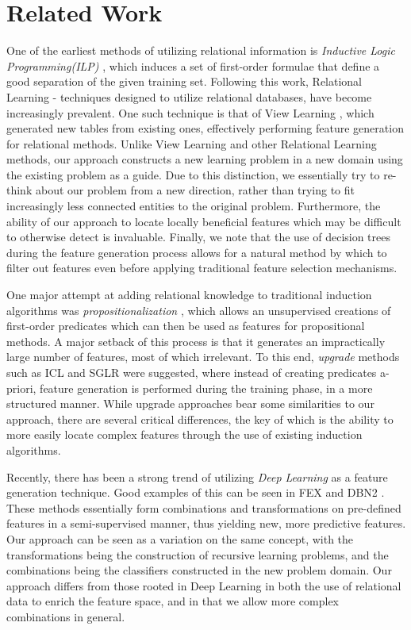 \documentclass[twoside,11pt]{article}
\theoremstyle{definition}
\begin{document}
\section{Related Work}
One of the earliest methods of utilizing relational information is \emph{Inductive Logic Programming(ILP)} \cite{quinlan1990learning,muggleton1991inductive}, which induces a set of first-order formulae that define a good separation of the given training set.
Following this work, Relational Learning - techniques designed to utilize relational databases, have become increasingly prevalent. One such technique is that of View Learning \cite{davis2005view}, which generated new tables from existing ones, effectively performing feature generation for relational methods.
Unlike View Learning and other Relational Learning methods, our approach constructs a new learning problem in a new domain using the existing problem as a guide. Due to this distinction, we essentially try to re-think about our problem from a new direction, rather than trying to fit increasingly less connected entities to the original problem. Furthermore, the ability of our approach to locate locally beneficial features which may be difficult to otherwise detect is invaluable. Finally, we note that the use of decision trees during the feature generation process allows for a natural method by which to filter out features even before applying traditional feature selection mechanisms.

One major attempt at adding relational knowledge to traditional induction algorithms was \emph{propositionalization} \cite{kramer2000bottom}, which allows an unsupervised creations of first-order predicates which can then be used as features for propositional methods. A major setback of this process is that it generates an impractically large number of features, most of which irrelevant.  To this end, \emph{upgrade} methods such as ICL \cite{van2001upgrade} and SGLR \cite{popescul200716} were suggested, where instead of creating predicates a-priori, feature generation is performed during the training phase, in a more structured manner. While upgrade approaches bear some similarities to our approach, there are several critical differences, the key of which is the ability to more easily locate complex features through the use of existing induction algorithms.

Recently, there has been a strong trend of utilizing \emph{Deep Learning} \cite{lecun1998gradient,bengio2009learning} as a feature generation technique. Good examples of this can be seen in FEX \cite{plotz2011featurefull} and DBN2 \cite{kim2013deepfull}. These methods essentially form combinations and transformations on pre-defined features in a semi-supervised manner, thus yielding new, more predictive features. Our approach can be seen as a variation on the same concept, with the transformations being the construction of recursive learning problems, and the combinations being the classifiers constructed in the new problem domain. Our approach differs from those rooted in Deep Learning in both the use of relational data to enrich the feature space, and in that we allow more complex combinations in general.
\end{document}
